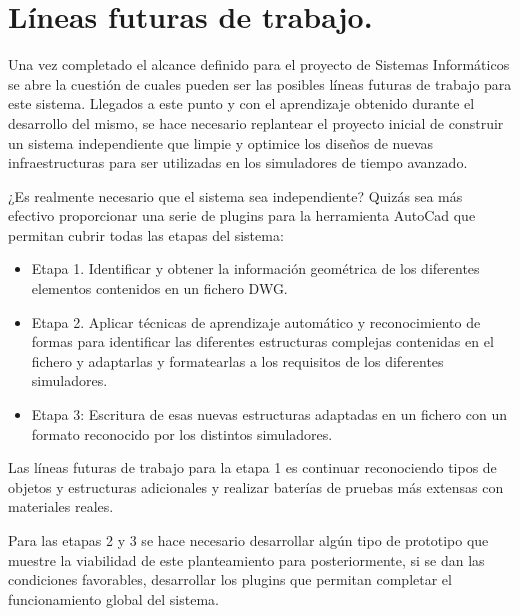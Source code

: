 \section{Líneas futuras de trabajo.}

Una vez completado el alcance definido para el proyecto de Sistemas Informáticos se abre la cuestión de cuales pueden ser las posibles líneas futuras de trabajo para este sistema. Llegados a este punto y con el aprendizaje obtenido durante el desarrollo del mismo, se hace necesario replantear el proyecto inicial de construir un sistema independiente que limpie y optimice los diseños de nuevas infraestructuras para ser utilizadas en los simuladores de tiempo avanzado. 

¿Es realmente necesario que el sistema sea independiente? Quizás sea más efectivo proporcionar una serie de plugins para la herramienta AutoCad que permitan cubrir todas las etapas del sistema:

\begin{itemize}

\item{Etapa 1. Identificar y obtener la información geométrica de los diferentes elementos contenidos en un fichero DWG.}
\item{Etapa 2. Aplicar técnicas de aprendizaje automático y reconocimiento de formas para identificar las diferentes estructuras complejas contenidas en el fichero y adaptarlas y formatearlas a los requisitos de los diferentes simuladores.}
\item{Etapa 3: Escritura de esas nuevas estructuras adaptadas en un fichero con un formato reconocido por los distintos simuladores.}

\end{itemize}

Las líneas futuras de trabajo para la etapa 1 es continuar reconociendo tipos de objetos y estructuras adicionales y realizar baterías de pruebas más extensas con materiales reales.

Para las etapas 2 y 3 se hace necesario desarrollar algún tipo de prototipo que muestre la viabilidad de este planteamiento para posteriormente, si se dan las condiciones favorables, desarrollar los plugins que permitan completar el funcionamiento global del sistema.